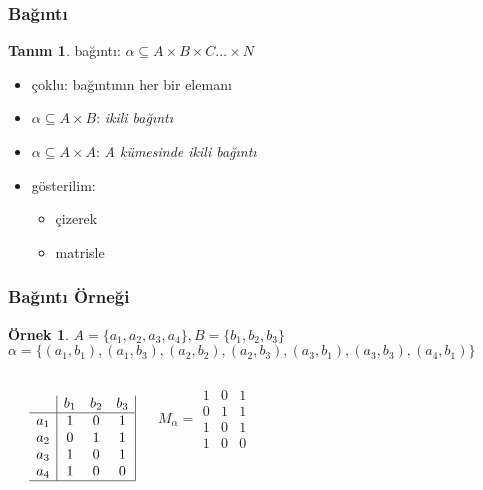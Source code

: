 \documentclass[dvipsnames]{beamer}
\theoremstyle{definition}
\newtheorem{tanim}[theorem]{Tanım}
\theoremstyle{example}
\newtheorem{ornek}[theorem]{Örnek}
\theoremstyle{plain}
\begin{document}
\begin{frame}
  \frametitle{Bağıntı}

  \begin{tanim}
    \alert{bağıntı}: $\alpha \subseteq A \times B \times C \dots \times N$
  \end{tanim}

  \pause
  \begin{itemize}
    \item \alert{çoklu}: bağıntının her bir elemanı

    \pause
    \medskip
    \item $\alpha \subseteq A \times B$: \emph{ikili bağıntı}
    \item $\alpha \subseteq A \times A$: \emph{A kümesinde ikili bağıntı}

    \pause
    \medskip
    \item gösterilim:
    \begin{itemize}
      \item çizerek
      \item matrisle
    \end{itemize}
  \end{itemize}
\end{frame}

\begin{frame}
  \frametitle{Bağıntı Örneği}

  \begin{ornek}
    $A=\{a_1,a_2,a_3,a_4\}, B=\{b_1,b_2,b_3\}$\\
    $\alpha = \{(a_1,b_1),(a_1,b_3),(a_2,b_2),(a_2,b_3),
                (a_3,b_1),(a_3,b_3),(a_4,b_1)\}$

    \pause
    \medskip
    \begin{columns}
      \begin{center}
      \end{center}

      \[
        \begin{array}{c|ccc|}
              & b_1 & b_2 & b_3\\\hline
          a_1 &  1  &  0  &  1\\
          a_2 &  0  &  1  &  1\\
          a_3 &  1  &  0  &  1\\
          a_4 &  1  &  0  &  0\\\hline
        \end{array}
      \]

      \[
        M_\alpha =
          \begin{array}{|ccc|}
            1 & 0 & 1\\
            0 & 1 & 1\\
            1 & 0 & 1\\
            1 & 0 & 0
          \end{array}
      \]
    \end{columns}
  \end{ornek}
\end{frame}
\end{document}
